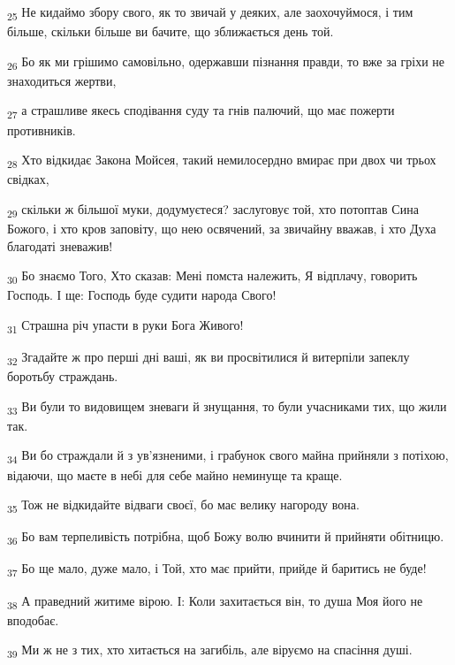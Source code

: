 \begin{tcolorbox}
\textsubscript{25} Не кидаймо збору свого, як то звичай у деяких, але заохочуймося, і тим більше, скільки більше ви бачите, що зближається день той.
\end{tcolorbox}
\begin{tcolorbox}
\textsubscript{26} Бо як ми грішимо самовільно, одержавши пізнання правди, то вже за гріхи не знаходиться жертви,
\end{tcolorbox}
\begin{tcolorbox}
\textsubscript{27} а страшливе якесь сподівання суду та гнів палючий, що має пожерти противників.
\end{tcolorbox}
\begin{tcolorbox}
\textsubscript{28} Хто відкидає Закона Мойсея, такий немилосердно вмирає при двох чи трьох свідках,
\end{tcolorbox}
\begin{tcolorbox}
\textsubscript{29} скільки ж більшої муки, додумуєтеся? заслуговує той, хто потоптав Сина Божого, і хто кров заповіту, що нею освячений, за звичайну вважав, і хто Духа благодаті зневажив!
\end{tcolorbox}
\begin{tcolorbox}
\textsubscript{30} Бо знаємо Того, Хто сказав: Мені помста належить, Я відплачу, говорить Господь. І ще: Господь буде судити народа Свого!
\end{tcolorbox}
\begin{tcolorbox}
\textsubscript{31} Страшна річ упасти в руки Бога Живого!
\end{tcolorbox}
\begin{tcolorbox}
\textsubscript{32} Згадайте ж про перші дні ваші, як ви просвітилися й витерпіли запеклу боротьбу страждань.
\end{tcolorbox}
\begin{tcolorbox}
\textsubscript{33} Ви були то видовищем зневаги й знущання, то були учасниками тих, що жили так.
\end{tcolorbox}
\begin{tcolorbox}
\textsubscript{34} Ви бо страждали й з ув'язненими, і грабунок свого майна прийняли з потіхою, відаючи, що маєте в небі для себе майно неминуще та краще.
\end{tcolorbox}
\begin{tcolorbox}
\textsubscript{35} Тож не відкидайте відваги своєї, бо має велику нагороду вона.
\end{tcolorbox}
\begin{tcolorbox}
\textsubscript{36} Бо вам терпеливість потрібна, щоб Божу волю вчинити й прийняти обітницю.
\end{tcolorbox}
\begin{tcolorbox}
\textsubscript{37} Бо ще мало, дуже мало, і Той, хто має прийти, прийде й баритись не буде!
\end{tcolorbox}
\begin{tcolorbox}
\textsubscript{38} А праведний житиме вірою. І: Коли захитається він, то душа Моя його не вподобає.
\end{tcolorbox}
\begin{tcolorbox}
\textsubscript{39} Ми ж не з тих, хто хитається на загибіль, але віруємо на спасіння душі.
\end{tcolorbox}
